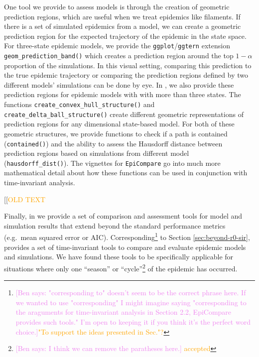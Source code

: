 \documentclass[
  shortnames]{jss}
\begin{document}
One tool we provide to assess models is through the creation of
geometric prediction regions, which are useful when we treat epidemics
like filaments. If there is a set of simulated epidemics from a model,
we can create a geometric prediction region for the expected trajectory
of the epidemic in the state space. For three-state epidemic models, we
provide the \texttt{ggplot}/\texttt{ggtern} extension
\texttt{geom\_prediction\_band()} which creates a prediction region
around the top \(1-\alpha\) proportion of the simulations. In this
visual setting, comparing this prediction to the true epidemic
trajectory or comparing the prediction regions defined by two different
models' simulations can be done by eye. In , we also
provide these prediction regions for epidemic models with with more than
three states. The functions \texttt{create\_convex\_hull\_structure()}
and \texttt{create\_delta\_ball\_structure()} create different geometric
representations of prediction regions for any dimensional state-based
model. For both of these geometric structures, we provide functions to
check if a path is contained (\texttt{contained()}) and the ability to
assess the Hausdorff distance between prediction regions based on
simulations from different model (\texttt{hausdorff\_dist()}). The
vignettes for \texttt{EpiCompare} go into much more mathematical detail
about how these functions can be used in conjunction with time-invariant
analysis.

{[}{[}\textcolor{orange}{OLD TEXT}

Finally, in  we provide a set of comparison and
assessment tools for model and simulation results that extend beyond the
standard performance metrics (e.g.~mean squared error or AIC).
Corresponding\footnote{\textcolor{violet}{[Ben says: "corresponding to" doesn't seem to be the correct phrase here. If we wanted to use "corresponding" I might imagine saying "corresponding to the araguments for time-invariant analysis in Section 2.2, EpiCompare provides such tools." I'm open to keeping it if you think it's the perfect word choice.]}\textcolor{orange}{"To support the ideas presented in Sec."?}}
to Section \ref{sec:beyond-r0-sir},  provides a set of
time-invariant tools to compare and evaluate epidemic models and
simulations. We have found these tools to be specifically applicable for
situations where only one ``season'' or
``cycle''\footnote{\textcolor{violet}{[Ben says: I think we can remove the paratheses here.]} \textcolor{orange}{accepted}}
of the epidemic has occurred.
\end{document}

